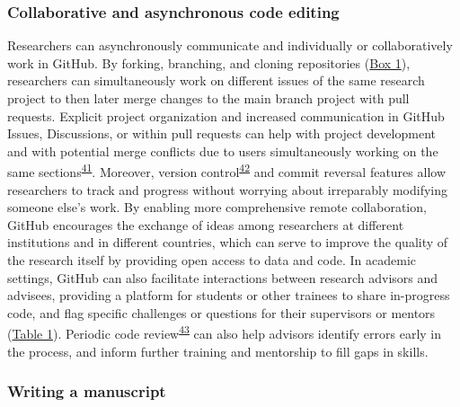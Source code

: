 \hypertarget{collaborative-and-asynchronous-code-editing}{%
\subsubsection{Collaborative and asynchronous code editing}\label{collaborative-and-asynchronous-code-editing}}

Researchers can asynchronously communicate and individually or collaboratively work in GitHub.
By forking, branching, and cloning repositories (\protect\hyperlink{definitions}{Box 1}), researchers can simultaneously work on different issues of the same research project to then later merge changes to the main branch project with pull requests.
Explicit project organization and increased communication in GitHub Issues, Discussions, or within pull requests can help with project development and with potential merge conflicts due to users simultaneously working on the same sections\textsuperscript{\protect\hyperlink{ref-1BJcvyTmV}{41}}.
Moreover, version control\textsuperscript{\protect\hyperlink{ref-K7nbP1Ty}{42}} and commit reversal features allow researchers to track and progress without worrying about irreparably modifying someone else's work.
By enabling more comprehensive remote collaboration, GitHub encourages the exchange of ideas among researchers at different institutions and in different countries, which can serve to improve the quality of the research itself by providing open access to data and code.
In academic settings, GitHub can also facilitate interactions between research advisors and advisees, providing a platform for students or other trainees to share in-progress code, and flag specific challenges or questions for their supervisors or mentors (\protect\hyperlink{tbl:roles}{Table 1}).
Periodic code review\textsuperscript{\protect\hyperlink{ref-hm9PaCLD}{43}} can also help advisors identify errors early in the process, and inform further training and mentorship to fill gaps in skills.

\hypertarget{writing-a-manuscript}{%
\subsubsection{Writing a manuscript}\label{writing-a-manuscript}}

